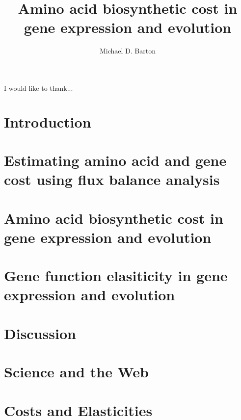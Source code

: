 \documentclass[12pt,PhD]{muthesis}
\begin{document}
\title{Amino acid biosynthetic cost in gene expression and evolution}
\author{Michael D. Barton}

\beforeabstract

\printnomenclature[3cm]


\afterabstract

I would like to thank...
\afterpreface

\chapter{Introduction}

\chapter{Estimating amino acid and gene cost using flux balance analysis}

\chapter{Amino acid biosynthetic cost in gene expression and evolution}

\chapter{Gene function elasiticity in gene expression and evolution}

\chapter{Discussion}





\appendix
\addappheadtotoc
\appendixpage
\chapter{Science and the Web}

\chapter{Costs and Elasticities}

\end{document}
